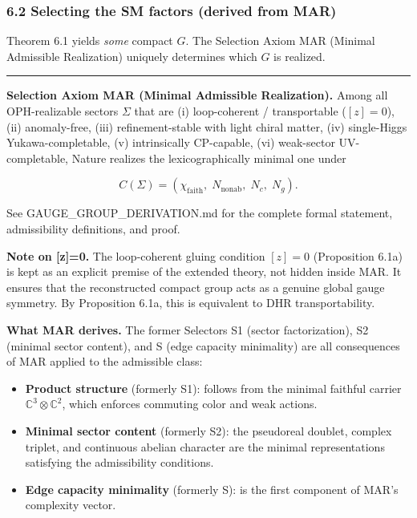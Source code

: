 \documentclass[11pt,a4paper]{article}
\theoremstyle{remark}
\providecommand{\tightlist}{%
  \setlength{\itemsep}{0pt}\setlength{\parskip}{0pt}}
\begin{document}
\subsubsection{6.2 Selecting the SM factors (derived from MAR)}\label{selecting-the-sm-factors-derived-from-mar}

Theorem 6.1 yields \emph{some} compact \(G\). The Selection Axiom MAR (Minimal
Admissible Realization) uniquely determines which \(G\) is realized.

\begin{center}\rule{0.5\linewidth}{0.5pt}\end{center}

\textbf{Selection Axiom MAR (Minimal Admissible Realization).} Among all
OPH-realizable sectors \(\Sigma\) that are (i) loop-coherent / transportable
(\([z]=0\)), (ii) anomaly-free, (iii) refinement-stable with light chiral
matter, (iv) single-Higgs Yukawa-completable, (v) intrinsically CP-capable,
(vi) weak-sector UV-completable, Nature realizes the lexicographically
minimal one under

\[C(\Sigma) = (\chi_{\mathrm{faith}},\; N_{\mathrm{nonab}},\; N_c,\; N_g).\]

See GAUGE\_GROUP\_DERIVATION.md for the complete formal statement, admissibility
definitions, and proof.

\textbf{Note on {[}z{]}=0.} The loop-coherent gluing condition \([z]=0\) (Proposition
6.1a) is kept as an explicit premise of the extended theory, not hidden inside
MAR. It ensures that the reconstructed compact group acts as a genuine global
gauge symmetry. By Proposition 6.1a, this is equivalent to DHR
transportability.

\textbf{What MAR derives.} The former Selectors S1 (sector factorization), S2
(minimal sector content), and S (edge capacity minimality) are all consequences
of MAR applied to the admissible class:

\begin{itemize}
\tightlist
\item
  \textbf{Product structure} (formerly S1): follows from the minimal faithful carrier
  \(\mathbb{C}^3 \otimes \mathbb{C}^2\), which enforces commuting color and weak
  actions.
\item
  \textbf{Minimal sector content} (formerly S2): the pseudoreal doublet, complex
  triplet, and continuous abelian character are the minimal representations
  satisfying the admissibility conditions.
\item
  \textbf{Edge capacity minimality} (formerly S): is the first component of MAR's
  complexity vector.
\end{itemize}
\end{document}
